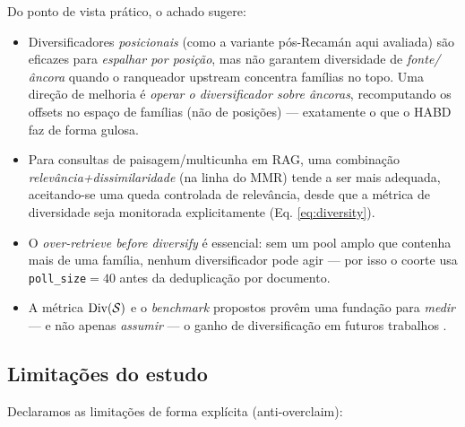 Do ponto de vista prático, o achado sugere:

\begin{itemize}
  \item Diversificadores \emph{posicionais} (como a variante pós-Recamán aqui
        avaliada) são eficazes para \emph{espalhar por posição}, mas não garantem
        diversidade de \emph{fonte/âncora} quando o ranqueador upstream concentra
        famílias no topo. Uma direção de melhoria é \emph{operar o diversificador
        sobre âncoras}, recomputando os offsets no espaço de famílias (não de
        posições) — exatamente o que o HABD faz de forma gulosa.
  \item Para consultas de paisagem/multicunha em RAG, uma combinação
        \emph{relevância+dissimilaridade} (na linha do MMR) tende a ser mais
        adequada, aceitando-se uma queda controlada de relevância, desde que a
        métrica de diversidade seja monitorada explicitamente (Eq.
        \ref{eq:diversity}).
  \item O \emph{over-retrieve before diversify} é essencial: sem um pool amplo que
        contenha mais de uma família, nenhum diversificador pode agir — por isso o
        coorte usa \texttt{poll\_size}$=40$ antes da deduplicação por documento.
  \item A métrica $\mathrm{Div}(\mathcal{S})$ e o \emph{benchmark} propostos provêm uma
        fundação para \emph{medir} — e não apenas \emph{assumir} — o ganho de
        diversificação em futuros trabalhos \citep{Yu2024RAGEvalSurvey}.
\end{itemize}

\subsection{Limitações do estudo}

Declaramos as limitações de forma explícita (anti-overclaim):

